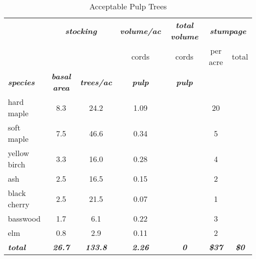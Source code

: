 \documentclass[landscape]{article}
\begin{document}
\begin{table}[H]

\caption{\label{tab:unnamed-chunk-21}Acceptable Pulp Trees}
\fontsize{10}{12}\selectfont
\begin{tabular}[t]{lcccccc}
\toprule
\multicolumn{1}{c}{\em{\textbf{ }}} & \multicolumn{2}{c}{\em{\textbf{stocking}}} & \multicolumn{1}{c}{\em{\textbf{volume/ac }}} & \multicolumn{1}{c}{\em{\textbf{total volume}}} & \multicolumn{2}{c}{\em{\textbf{stumpage}}} \\
\cmidrule(l{3pt}r{3pt}){2-3} \cmidrule(l{3pt}r{3pt}){4-4} \cmidrule(l{3pt}r{3pt}){5-5} \cmidrule(l{3pt}r{3pt}){6-7}
\multicolumn{3}{c}{ } & \multicolumn{1}{c}{cords} & \multicolumn{1}{c}{cords} & \multicolumn{1}{c}{per acre} & \multicolumn{1}{c}{total} \\
\cmidrule(l{3pt}r{3pt}){4-4} \cmidrule(l{3pt}r{3pt}){5-5} \cmidrule(l{3pt}r{3pt}){6-6} \cmidrule(l{3pt}r{3pt}){7-7}
\rowcolor[HTML]{DCDCDC}  \em{\textbf{species}} & \em{\textbf{basal area}} & \em{\textbf{trees/ac}} & \em{\textbf{pulp}} & \em{\textbf{pulp}} & \em{\textbf{ }} & \em{\textbf{ }}\\
\midrule
\rowcolor{gray!6}  hard maple & 8.3 & 24.2 & 1.09 &  & 20 & \\
 
soft maple & 7.5 & 46.6 & 0.34 &  & 5 & \\
 
\rowcolor{gray!6}  yellow birch & 3.3 & 16.0 & 0.28 &  & 4 & \\
 
ash & 2.5 & 16.5 & 0.15 &  & 2 & \\
 
\rowcolor{gray!6}  black cherry & 2.5 & 21.5 & 0.07 &  & 1 & \\
 
basswood & 1.7 & 6.1 & 0.22 &  & 3 & \\
 
\rowcolor{gray!6}  elm & 0.8 & 2.9 & 0.11 &  & 2 & \\
 
\rowcolor[HTML]{DCDCDC}  \em{\textbf{total}} & \em{\textbf{26.7}} & \em{\textbf{133.8}} & \em{\textbf{2.26}} & \em{\textbf{0}} & \em{\textbf{\$37}} & \em{\textbf{\$0}}\\
\bottomrule
\end{tabular}
\end{table}
\end{document}
